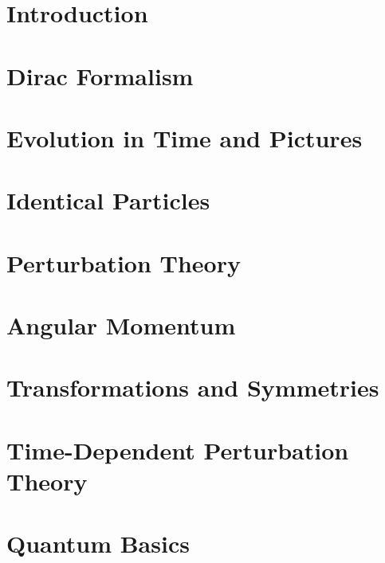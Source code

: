 \documentclass[british,11pt,a4paper]{report}
\begin{document}
\maketitle
\tableofcontents

\chapter{Introduction}

\chapter{Dirac Formalism}

\chapter{Evolution in Time and Pictures}

\chapter{Identical Particles}

\chapter{Perturbation Theory}

\chapter{Angular Momentum}

\chapter{Transformations and Symmetries}

\chapter{Time-Dependent Perturbation Theory}

\chapter{Quantum Basics}

\end{document}
